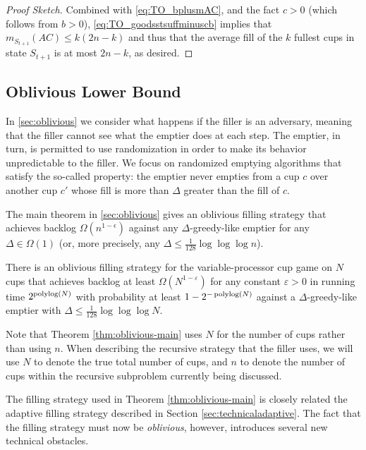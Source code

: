 \begin{proof}[Proof Sketch]
Combined with \eqref{eq:TO_bplusmAC}, and the fact $c>0$ (which
follows from $b > 0$), \eqref{eq:TO_goodsstsuffminuscb} implies
that $m_{S_{t + 1}}(AC) \le k(2n - k)$ and thus that the average
fill of the $k$ fullest cups in state $S_{t+1}$ is at most
$2n-k$, as desired.
\end{proof}
\subsection{Oblivious Lower Bound}

In \cref{sec:oblivious} we consider what happens if the filler is an
 adversary, meaning that the filler cannot see what
the emptier does at each step. The emptier, in turn, is permitted to
use randomization in order to make its behavior unpredictable to the
filler. We focus on randomized emptying algorithms that satisfy the
so-called  property: the emptier never
empties from a cup $c$ over another cup $c'$ whose fill is more than
$\Delta$ greater than the fill of $c$.

The main theorem in \cref{sec:oblivious} gives an oblivious filling
strategy that achieves backlog $\Omega(n^{1 - \epsilon})$ against any
$\Delta$-greedy-like emptier for any $\Delta \in \Omega(1)$ (or, more
precisely, any $\Delta \le \frac{1}{128} \log \log \log n$).

\begin{theorem}
  There is an oblivious filling strategy for the
  variable-processor cup game on $N$ cups that achieves backlog
  at least $\Omega(N^{1-\varepsilon})$ for any constant $\varepsilon
  >0$ in running time $2^{\operatorname{\text{polylog}}(N)}$ with probability at least
  $1-2^{-\operatorname{\text{polylog}}(N)}$ against a $\Delta$-greedy-like emptier
  with $\Delta \le \frac{1}{128} \log\log\log N$.
  \label{thm:oblivious-main}
\end{theorem}

Note that Theorem \ref{thm:oblivious-main} uses $N$ for the number of
cups rather than using $n$. When describing the recursive strategy
that the filler uses, we will use $N$ to denote the true total number
of cups, and $n$ to denote the number of cups within the recursive
subproblem currently being discussed.

The filling strategy used in Theorem \ref{thm:oblivious-main} is
closely related the adaptive filling strategy described in Section
\ref{sec:technicaladaptive}. The fact that the filling strategy must
now be \emph{oblivious}, however, introduces several new technical
obstacles.


